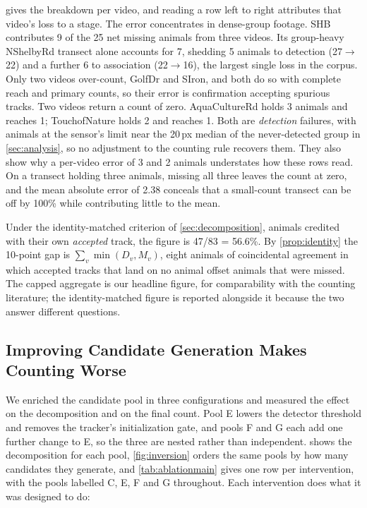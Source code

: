  gives the breakdown per video, and reading a row left to right
attributes that video's loss to a stage. The error concentrates in dense-group footage. SHB
contributes 9 of the 25 net missing animals from three videos. Its group-heavy NShelbyRd
transect alone accounts for 7, shedding 5 animals to detection (27$\to$22) and a further 6
to association (22$\to$16), the largest single loss in the corpus. Only two videos
over-count, GolfDr and SIron, and both do so with complete reach and primary counts, so
their error is confirmation accepting spurious tracks. Two videos return a count of zero.
AquaCultureRd holds 3 animals and reaches 1; TouchofNature holds 2 and reaches 1. Both are
\emph{detection} failures, with animals at the sensor's limit near the 20\,px median of the
never-detected group in \cref{sec:analysis}, so no adjustment to the counting rule recovers
them. They also show why a per-video error of 3 and 2 animals understates how these rows
read. On a transect holding three animals, missing all three leaves the count at zero, and
the mean absolute error of 2.38 conceals that a small-count transect can be off by 100\%
while contributing little to the mean.

Under the identity-matched criterion of \cref{sec:decomposition}, animals credited with
their own \emph{accepted} track, the figure is 47/83 = 56.6\%. By \cref{prop:identity} the
10-point gap is $\sum_v\min(D_v,M_v)$, eight animals of coincidental agreement in which
accepted tracks that land on no animal offset animals that were missed. The capped
aggregate is our headline figure, for comparability with the counting literature; the
identity-matched figure is reported alongside it because the two answer different
questions.

\subsection{Improving Candidate Generation Makes Counting Worse}
\label{sec:inversion}

We enriched the candidate pool in three configurations and measured the effect on the
decomposition and on the final count. Pool E lowers the detector threshold and removes the
tracker's initialization gate, and pools F and G each add one further change to E, so the
three are nested rather than independent.  shows the decomposition for each
pool, \cref{fig:inversion} orders the same pools by how many candidates they generate, and
\cref{tab:ablationmain} gives one row per intervention, with the pools labelled C, E, F and
G throughout. Each intervention does what it was designed to do:

